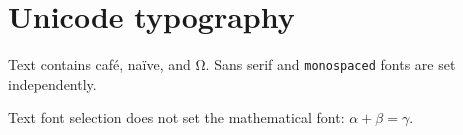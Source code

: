 \documentclass{article}
\begin{document}
\section{Unicode typography}
Text contains café, naïve, and Ω. \textsf{Sans serif} and \texttt{monospaced} fonts are set independently.

Text font selection does not set the mathematical font: $\alpha+\beta=\gamma$.
\end{document}
